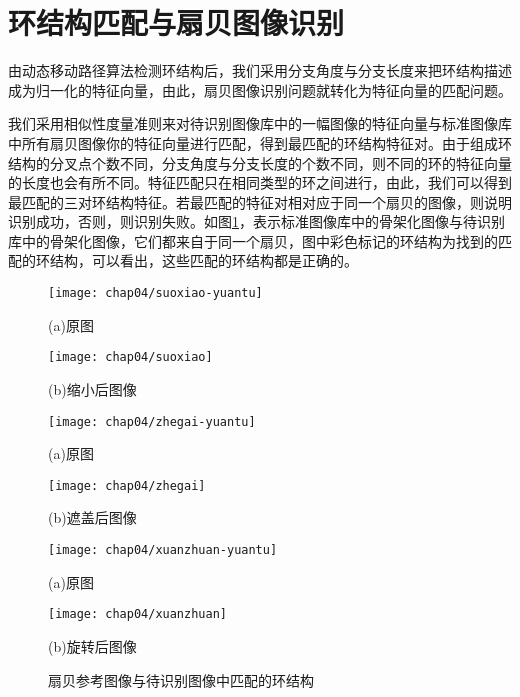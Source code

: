 \section{环结构匹配与扇贝图像识别}
\label{}

由动态移动路径算法检测环结构后，我们采用分支角度与分支长度来把环结构描述成为归一化的特征向量，由此，扇贝图像识别问题就转化为特征向量的匹配问题。

我们采用相似性度量准则来对待识别图像库中的一幅图像的特征向量与标准图像库中所有扇贝图像你的特征向量进行匹配，得到最匹配的环结构特征对。由于组成环结构的分叉点个数不同，分支角度与分支长度的个数不同，则不同的环的特征向量的长度也会有所不同。特征匹配只在相同类型的环之间进行，由此，我们可以得到最匹配的三对环结构特征。若最匹配的特征对相对应于同一个扇贝的图像，则说明识别成功，否则，则识别失败。如图\ref{fig:recognition}，表示标准图像库中的骨架化图像与待识别库中的骨架化图像，它们都来自于同一个扇贝，图中彩色标记的环结构为找到的匹配的环结构，可以看出，这些匹配的环结构都是正确的。

\begin{figure}
\centering
  \begin{minipage}[b]{0.48\textwidth} 
      \centering 
      \texttt{[image: chap04/suoxiao-yuantu]}
        \centerline{(a)原图}\medskip
    \end{minipage}
  \begin{minipage}[b]{0.48\textwidth}
    \centering
    \texttt{[image: chap04/suoxiao]}
      \centerline{(b)缩小后图像}\medskip
    \end{minipage}
  \begin{minipage}[b]{0.48\textwidth} 
      \centering 
      \texttt{[image: chap04/zhegai-yuantu]}
        \centerline{(a)原图}\medskip
    \end{minipage}
  \begin{minipage}[b]{0.48\textwidth}
    \centering
    \texttt{[image: chap04/zhegai]}
      \centerline{(b)遮盖后图像}\medskip
    \end{minipage}
  \begin{minipage}[b]{0.48\textwidth} 
      \centering 
      \texttt{[image: chap04/xuanzhuan-yuantu]}
        \centerline{(a)原图}\medskip
    \end{minipage}
  \begin{minipage}[b]{0.48\textwidth}
    \centering
    \texttt{[image: chap04/xuanzhuan]}
      \centerline{(b)旋转后图像}\medskip
    \end{minipage}
\caption{扇贝参考图像与待识别图像中匹配的环结构}
\label{fig:recognition}
\end{figure}

